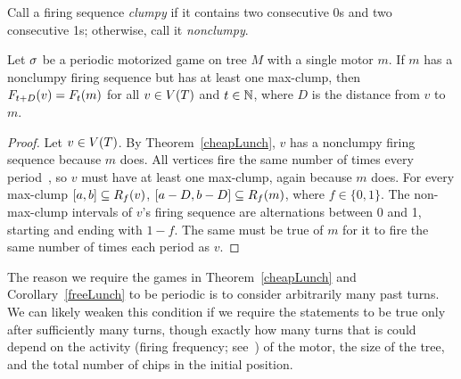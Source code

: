 Call a firing sequence \emph{clumpy} if it contains two consecutive 0s and two
consecutive 1s; otherwise, call it \emph{nonclumpy}.

\begin{cor} \label{freeLunch}
Let $\s$ be a periodic motorized game on tree $M$ with a single motor $m$. If
$m$ has a nonclumpy firing sequence but has at least one max-clump, then
$\firing{v}{t+D} = \firing{m}{t}$ for all $v \in \V[T]$ and $t \in \nats$,
where $D$ is the distance from $v$ to $m$.
\end{cor}

\begin{proof}
Let $v \in \V[T]$. By Theorem~\ref{cheapLunch}, $v$ has a nonclumpy firing
sequence because $m$ does. All vertices fire the same number of times every
period~\cite[Proposition~2.5]{jiang}, so $v$ must have at least one max-clump,
again because $m$ does. For every max-clump $[a, b] \subseteq \pat{v}{f}$,
$[a-D, b-D] \subseteq \pat{m}{f}$, where $f \in \{0,1\}$. The non-max-clump
intervals of $v$'s firing sequence are alternations between 0 and 1, starting
and ending with $1-f$. The same must be true of $m$ for it to fire the same
number of times each period as $v$.
\end{proof}

The reason we require the games in Theorem~\ref{cheapLunch} and
Corollary~\ref{freeLunch} to be periodic is to consider arbitrarily many past
turns. We can likely weaken this condition if we require the statements to be
true only after sufficiently many turns, though exactly how many turns that is
could depend on the activity (firing frequency; see~\cite{levine}) of the
motor, the size of the tree, and the total number of chips in the initial
position.
